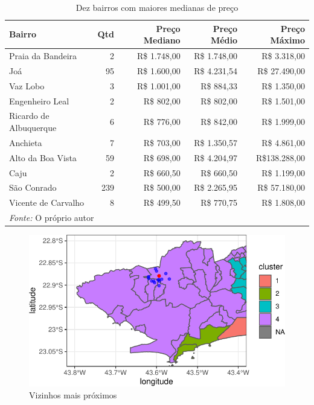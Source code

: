 \documentclass[
	12pt,				%
	a4paper,		%
	oneside,    %
	chapter=TITLE,		   %
	section=TITLE,		   %
	subsection=TITLE,	   %
	subsubsection=TITLE, %
	english,			%
	french,				%
	spanish,			%
	brazil,				%
]{abntex2}
\begin{document}
\begin{table}

\caption{\label{tab:top_10_bairros}Dez bairros com maiores medianas de preço}
\centering
\begin{tabular}[t]{l|r|r|r|r}
\hline
Bairro & Qtd & Preço Mediano & Preço Médio & Preço Máximo\\
\hline
Praia da Bandeira & 2 & R\$ 1.748,00 & R\$ 1.748,00 & R\$  3.318,00\\
\hline
Joá & 95 & R\$ 1.600,00 & R\$ 4.231,54 & R\$ 27.490,00\\
\hline
Vaz Lobo & 3 & R\$ 1.001,00 & R\$   884,33 & R\$  1.350,00\\
\hline
Engenheiro Leal & 2 & R\$   802,00 & R\$   802,00 & R\$  1.501,00\\
\hline
Ricardo de Albuquerque & 6 & R\$   776,00 & R\$   842,00 & R\$  1.999,00\\
\hline
Anchieta & 7 & R\$   703,00 & R\$ 1.350,57 & R\$  4.861,00\\
\hline
Alto da Boa Vista & 59 & R\$   698,00 & R\$ 4.204,97 & R\$138.288,00\\
\hline
Caju & 2 & R\$   660,50 & R\$   660,50 & R\$  1.199,00\\
\hline
São Conrado & 239 & R\$   500,00 & R\$ 2.265,95 & R\$ 57.180,00\\
\hline
Vicente de Carvalho & 8 & R\$   499,50 & R\$   770,75 & R\$  1.808,00\\
\hline
\multicolumn{5}{l}{\textit{Fonte: } O próprio autor}\\
\end{tabular}
\end{table}

\begin{figure}
\centering
\includegraphics{00-TCC_files/figure-latex/vizinhos-1.pdf}
\caption{\label{vizinhos}Vizinhos mais próximos}
\end{figure}
\end{document}
